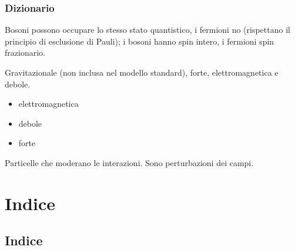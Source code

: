 \documentclass[letterpaper,10pt,italian]{jupyterBook}
\begin{document}
\section{Dizionario}
\label{\detokenize{ch/modern/standard:dizionario}}
\sphinxAtStartPar
{} Bosoni possono occupare lo stesso stato quantistico, i fermioni no (rispettano il principio di esclusione di Pauli); i bosoni hanno spin intero, i fermioni spin frazionario.

\sphinxAtStartPar
{} Gravitazionale (non inclusa nel modello standard), forte, elettromagnetica e debole.
\begin{itemize}
\item {} 
\sphinxAtStartPar
elettromagnetica

\item {} 
\sphinxAtStartPar
debole

\item {} 
\sphinxAtStartPar
forte

\end{itemize}

\sphinxAtStartPar
{} Particelle che moderano le interazioni. Sono perturbazioni dei campi.

\sphinxstepscope


\part{Indice}

\sphinxstepscope


\chapter{Indice}
\label{\detokenize{genindex:indice}}\label{\detokenize{genindex::doc}}
\end{document}
